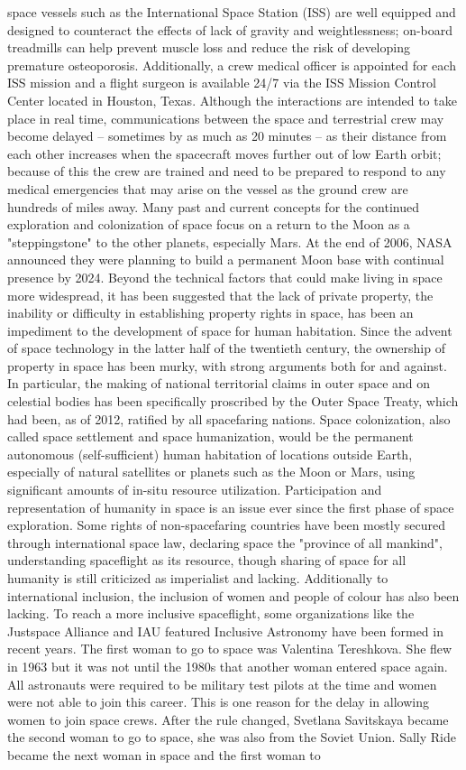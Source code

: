 \documentclass[12pt]{article}
\begin{document}
space vessels such as the International Space Station (ISS) are well equipped and designed to counteract the effects of lack of gravity and weightlessness; on-board treadmills can help prevent muscle loss and reduce the risk of developing premature osteoporosis. Additionally, a crew medical officer is appointed for each ISS mission and a flight surgeon is available 24/7 via the ISS Mission Control Center located in Houston, Texas. Although the interactions are intended to take place in real time, communications between the space and terrestrial crew may become delayed – sometimes by as much as 20 minutes – as their distance from each other increases when the spacecraft moves further out of low Earth orbit; because of this the crew are trained and need to be prepared to respond to any medical emergencies that may arise on the vessel as the ground crew are hundreds of miles away. Many past and current concepts for the continued exploration and colonization of space focus on a return to the Moon as a "steppingstone" to the other planets, especially Mars. At the end of 2006, NASA announced they were planning to build a permanent Moon base with continual presence by 2024. Beyond the technical factors that could make living in space more widespread, it has been suggested that the lack of private property, the inability or difficulty in establishing property rights in space, has been an impediment to the development of space for human habitation. Since the advent of space technology in the latter half of the twentieth century, the ownership of property in space has been murky, with strong arguments both for and against. In particular, the making of national territorial claims in outer space and on celestial bodies has been specifically proscribed by the Outer Space Treaty, which had been, as of 2012, ratified by all spacefaring nations. Space colonization, also called space settlement and space humanization, would be the permanent autonomous (self-sufficient) human habitation of locations outside Earth, especially of natural satellites or planets such as the Moon or Mars, using significant amounts of in-situ resource utilization. Participation and representation of humanity in space is an issue ever since the first phase of space exploration. Some rights of non-spacefaring countries have been mostly secured through international space law, declaring space the "province of all mankind", understanding spaceflight as its resource, though sharing of space for all humanity is still criticized as imperialist and lacking. Additionally to international inclusion, the inclusion of women and people of colour has also been lacking. To reach a more inclusive spaceflight, some organizations like the Justspace Alliance and IAU featured Inclusive Astronomy have been formed in recent years. The first woman to go to space was Valentina Tereshkova. She flew in 1963 but it was not until the 1980s that another woman entered space again. All astronauts were required to be military test pilots at the time and women were not able to join this career. This is one reason for the delay in allowing women to join space crews. After the rule changed, Svetlana Savitskaya became the second woman to go to space, she was also from the Soviet Union. Sally Ride became the next woman in space and the first woman to 
\end{document}
